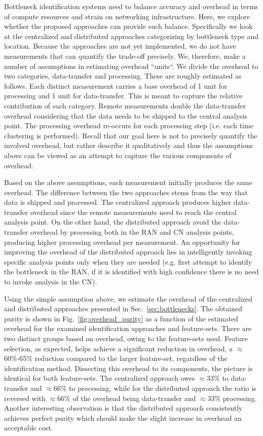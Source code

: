 \documentclass[journal,comsoc]{IEEEtran}
\begin{document}
% 
Bottleneck identification systems need to balance accuracy and overhead in terms of compute resources and strain on networking infrastructure.
Here, we explore whether the proposed approaches can provide such balance. 
Specifically we look at the centralized and distributed approaches categorizing by bottleneck type and location.
Because the approaches are not yet implemented, we do not have measurements that can quantify the trade-off precisely.
We, therefore, make a number of assumptions in estimating overhead ``units``.  
We divide the overhead to two categories, data-transfer and processing.
These are roughly estimated as follows.
Each distinct measurement carries a base overhead of 1 unit for processing and 1 unit for data-transfer.
This is meant to capture the relative contribution of each category.
Remote measurements double the data-transfer overhead considering that the data needs to be shipped to the central analysis point.
The processing overhead re-occurs for each processing step (i.e. each time clustering is performed).
Recall that our goal here is not to precisely quantify the involved overhead, but rather describe it qualitatively and thus the assumptions above can be viewed as an attempt to capture the various components of overhead. 
 

% 
Based on the above assumptions, each measurement initially produces the same overhead. 
The difference between the two approaches stems from the way that data is shipped and processed.
The centralized approach produces higher data-transfer overhead since the remote measurements need to reach the central analysis point. 
On the other hand, the distributed approach avoid the data-transfer overhead by processing both in the RAN and CN analysis points, producing higher processing overhead per measurement.
An opportunity for improving the overhead of the distributed approach lies in intelligently invoking specific analysis points only when they are needed (e.g. first attempt to identify the bottleneck in the RAN, if it is identified with high confidence there is no need to invoke analysis in the CN).

%
Using the simple assumption above, we estimate the overhead of the centralized and distributed approaches presented in Sec.~\ref{sec:bottlenecks}.
The obtained purity is shown in Fig.~\ref{fig:overhead_purity} as a function of the estimated overhead for the examined identification approaches and feature-sets.
There are two distinct groups based on overhead, owing to the feature-sets used. 
Feature selection, as expected, helps achieve a significant reduction in overhead, a $\approx$60\%-65\% reduction compared to the larger feature-set, regardless of the identification method.
Dissecting this overhead to its components, the picture is identical for both feature-sets. 
The centralized approach owes $\approx$33\% to data-transfer and $\approx$66\% to processing, while for the distributed approach the ratio is reversed with $\approx$66\% of the overhead being data-transfer and $\approx$33\% processing.
Another interesting observation is that the distributed approach consistently achieves perfect purity which should make the slight increase in overhead an acceptable cost.
\end{document}
